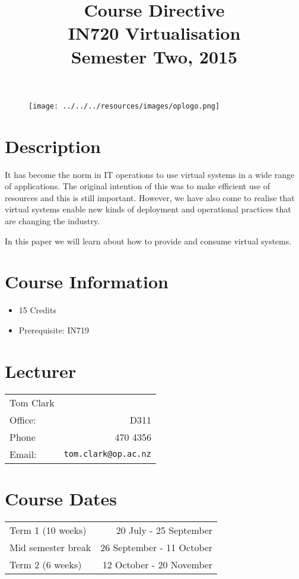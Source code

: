 \documentclass{article}
\begin{document}
\begin{figure}
\texttt{[image: ../../../resources/images/oplogo.png]}
\end{figure}

\title{Course Directive\\IN720 Virtualisation\\Semester Two, 2015}
\date{}
\maketitle

\section*{Description}
It has become the norm in IT operations to use virtual systems in a wide range of applications.  The original intention of this was to make efficient use of resources and this is still important.  However, we have also come to realise that virtual systems enable new kinds of deployment and operational practices that are changing the industry.

In this paper we will learn about how to provide and consume virtual systems.

\section*{Course Information}
\begin{itemize}
  \item 15 Credits
  \item Prerequisite: IN719
\end{itemize}

\section*{Lecturer}
\begin{tabular}{lr}

  Tom Clark &    \\
     Office: & D311 \\
     Phone & 470 4356 \\
     Email: & \texttt{tom.clark@op.ac.nz} \\
\end{tabular}

\section*{Course Dates}
\begin{tabular}{lr}
Term 1 (10 weeks) & 20 July - 25 September \\
Mid semester break & 26 September - 11 October \\
Term 2 (6 weeks) & 12 October - 20 November \\
\end{tabular}
\end{document}
